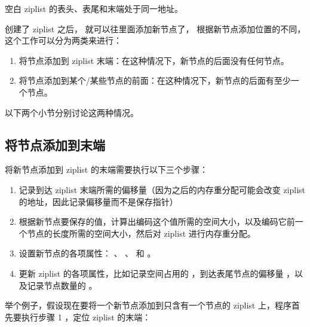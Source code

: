 \documentclass[a4paper,11pt,english]{sphinxmanual}
\begin{document}
空白 ziplist 的表头、表尾和末端处于同一地址。

创建了 ziplist 之后，
就可以往里面添加新节点了，
根据新节点添加位置的不同，
这个工作可以分为两类来进行：
\begin{enumerate}
\item {} 
将节点添加到 ziplist 末端：在这种情况下，新节点的后面没有任何节点。

\item {} 
将节点添加到某个/某些节点的前面：在这种情况下，新节点的后面有至少一个节点。

\end{enumerate}

以下两个小节分别讨论这两种情况。


\subsection{将节点添加到末端}
\label{compress-datastruct/ziplist:id4}
将新节点添加到 ziplist 的末端需要执行以下三个步骤：
\begin{enumerate}
\item {} 
记录到达 ziplist 末端所需的偏移量（因为之后的内存重分配可能会改变 ziplist 的地址，因此记录偏移量而不是保存指针）

\item {} 
根据新节点要保存的值，计算出编码这个值所需的空间大小，以及编码它前一个节点的长度所需的空间大小，然后对 ziplist 进行内存重分配。

\item {} 
设置新节点的各项属性：  、  、  和  。

\item {} 
更新 ziplist 的各项属性，比如记录空间占用的  ，到达表尾节点的偏移量  ，以及记录节点数量的  。

\end{enumerate}

举个例子，假设现在要将一个新节点添加到只含有一个节点的 ziplist 上，程序首先要执行步骤 1 ，定位 ziplist 的末端：
\end{document}
